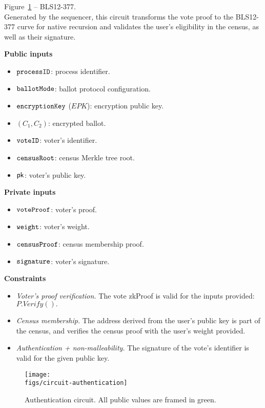 Figure~\ref{fig:circuit-authentication} -- BLS12-377.\\

\noi Generated by the sequencer, this circuit transforms the vote proof to the BLS12-377 curve for native recursion and validates the user's eligibility in the census, as well as their signature.

\begin{spacing}{1.25}
	\vspace{0.3cm}
	\noi \textbf{Public inputs}
	\begin{itemize}
		\item \public $\texttt{processID}$: process identifier.
		\item \public $\texttt{ballotMode}$: ballot protocol configuration.
		\item \public $\texttt{encryptionKey}$ ($EPK$): encryption public key.
		\item \public $(C_1, C_2)$: encrypted ballot.		
		\item \public $\texttt{voteID}$: voter's identifier.
		\item \public $\texttt{censusRoot}$: census Merkle tree root.
		\item \public ${\sf{pk}^{}}$: voter's public key.
	\end{itemize}
	\textbf{Private inputs}
	\begin{itemize}								
		\item \private $\texttt{voteProof}$: voter's proof.
		\item \private $\texttt{weight}$: voter's weight.
		\item \private $\texttt{censusProof}$: census membership proof.
		\item \private $\texttt{signature}$: voter's signature.
	\end{itemize}
	\textbf{Constraints}	
	\begin{itemize}
		\item \emph{Voter's proof verification.} The vote zkProof is valid for the inputs provided: $P.Verify().$
		\item \emph{Census membership.} The address derived from the user's public key is part of the census, and verifies the census proof with the user's weight provided.
		\item \emph{Authentication + non-malleability.} The signature of the vote's identifier is valid for the given public key.
	\end{itemize}
	\vspace{-0.3cm}
\end{spacing}

\begin{figure}[H]
	\centerline{\texttt{[image: \\figs/circuit-authentication]}}
	\caption{Authentication circuit. All public values are framed in green.}
	\label{fig:circuit-authentication}
\end{figure}

